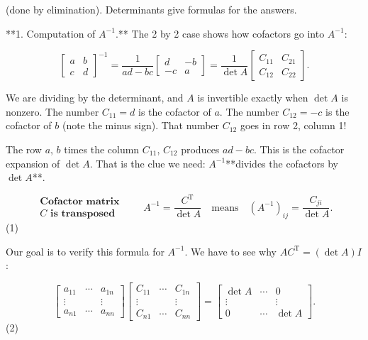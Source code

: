 (done by elimination). Determinants give formulas for the answers.

**1. Computation of \(A^{-1}\).** The 2 by 2 case shows how cofactors go into \(A^{-1}\):

\[\begin{bmatrix}a&b\\ c&d\end{bmatrix}^{-1}=\frac{1}{ad-bc}\begin{bmatrix}d&-b\\ -c&a\end{bmatrix}=\frac{1}{\det A}\begin{bmatrix}C_{11}&C_{21}\\ C_{12}&C_{22}\end{bmatrix}.\]

We are dividing by the determinant, and \(A\) is invertible exactly when \(\det A\) is nonzero. The number \(C_{11}=d\) is the cofactor of \(a\). The number \(C_{12}=-c\) is the cofactor of \(b\) (note the minus sign). That number \(C_{12}\) goes in row 2, column 1!

The row \(a\), \(b\) times the column \(C_{11}\), \(C_{12}\) produces \(ad-bc\). This is the cofactor expansion of \(\det A\). That is the clue we need: \(A^{-1}\)**divides the cofactors by \(\det A\)**.

\[\begin{array}{l}\textbf{Cofactor matrix}\\ C\textbf{ is transposed}\end{array}\qquad A^{-1}=\frac{C^{\mathrm{T}}}{\det A} \quad\text{means}\quad(A^{-1})_{ij}=\frac{C_{ji}}{\det A}.\] (1)

Our goal is to verify this formula for \(A^{-1}\). We have to see why \(AC^{\mathrm{T}}=(\det A)I\):

\[\begin{bmatrix}a_{11}&\cdots&a_{1n}\\ \vdots&&\vdots\\ a_{n1}&\cdots&a_{nn}\end{bmatrix}\begin{bmatrix}C_{11}&\cdots&C_{1n}\\ \vdots&&\vdots\\ C_{n1}&\cdots&C_{nn}\end{bmatrix}=\begin{bmatrix}\det A&\cdots&0\\ \vdots&&\vdots\\ 0&\cdots&\det A\end{bmatrix}.\] (2)

